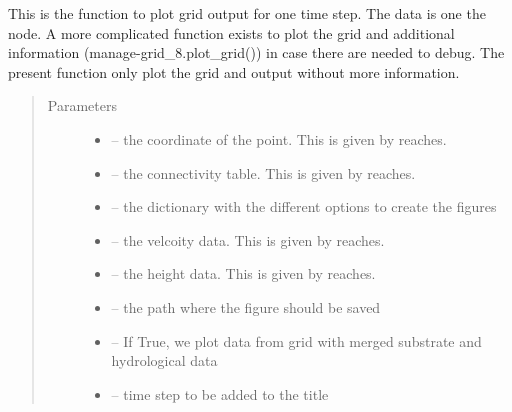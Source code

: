 \documentclass[letterpaper,10pt,english]{sphinxmanual}
\begin{document}

\begin{fulllineitems}
\label{\detokenize{index:src.manage_grid_8.plot_grid_simple}}
This is the function to plot grid output for one time step. The data is one the node. A more complicated function
exists to plot the grid and additional information (manage-grid\_8.plot\_grid()) in case there are needed to debug.
The present function only plot the grid and output without more information.
\begin{quote}\begin{description}
\item[{Parameters}] \leavevmode\begin{itemize}
\item {} 
 -- the coordinate of the point. This is given by reaches.

\item {} 
 -- the connectivity table. This is given by reaches.

\item {} 
 -- the dictionary with the different options to create the figures

\item {} 
 -- the velcoity data. This is given by reaches.

\item {} 
 -- the height data. This is given by reaches.

\item {} 
 -- the path where the figure should be saved

\item {} 
 -- If True, we plot data from grid with merged substrate and hydrological data

\item {} 
 -- time step to be added to the title

\end{itemize}

\end{description}\end{quote}

\end{fulllineitems}
\end{document}
